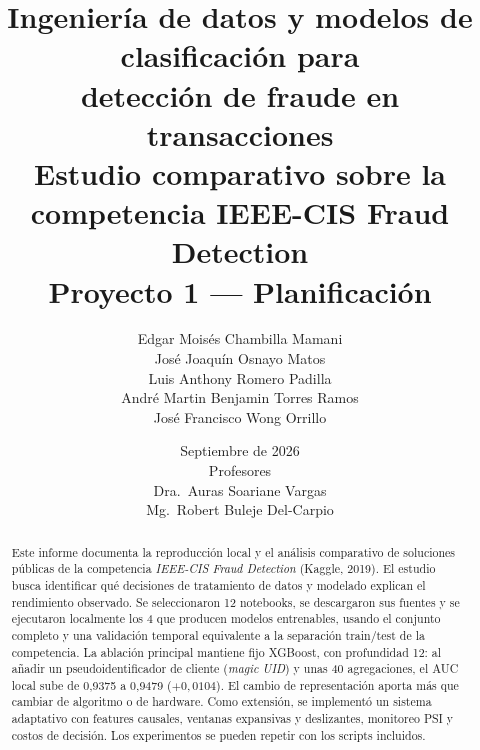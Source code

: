 \documentclass[11pt,a4paper]{report}
\title{\textbf{Ingeniería de datos y modelos de clasificación para\\ detección de fraude en transacciones}\\[6pt]
\large Estudio comparativo sobre la competencia IEEE-CIS Fraud Detection\\
\large Proyecto 1 — Planificación}
\author{Edgar Moisés Chambilla Mamani\\ José Joaquín Osnayo Matos\\ Luis Anthony Romero Padilla\\
        André Martin Benjamin Torres Ramos\\ José Francisco Wong Orrillo}
\date{Septiembre de 2026\\[10pt]
      {\large Profesores}\\[2pt]
      Dra.\ Auras Soariane Vargas\\ Mg.\ Robert Buleje Del-Carpio}
\begin{document}
\maketitle

\begin{abstract}
\noindent
Este informe documenta la reproducción local y el análisis comparativo de soluciones públicas de la
competencia \emph{IEEE-CIS Fraud Detection} (Kaggle, 2019). El estudio busca identificar qué decisiones
de tratamiento de datos y modelado explican el rendimiento observado. Se seleccionaron 12 notebooks,
se descargaron sus fuentes y se ejecutaron localmente los 4 que producen modelos entrenables, usando
el conjunto completo y una validación temporal equivalente a la separación train/test de la competencia.
La ablación principal mantiene fijo XGBoost, con profundidad 12: al añadir un pseudoidentificador de
cliente (\emph{magic UID}) y unas 40 agregaciones, el AUC local sube de 0{,}9375 a 0{,}9479
($+0{,}0104$). El cambio de representación aporta más que cambiar de algoritmo o de hardware.
Como extensión, se implementó un sistema adaptativo con features causales, ventanas expansivas y
deslizantes, monitoreo PSI y costos de decisión. Los experimentos se pueden repetir con los scripts
incluidos.
\end{abstract}

\tableofcontents
\listoffigures
\listoftables










\appendix




\end{document}
